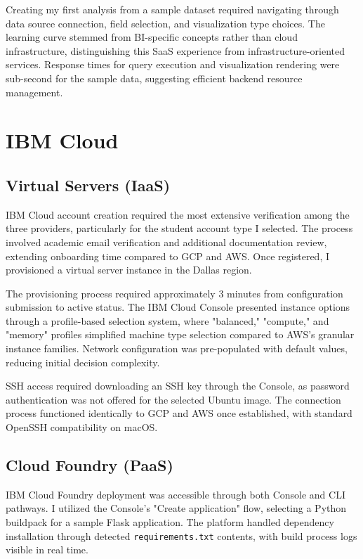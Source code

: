 \documentclass[11pt,a4paper]{article}
\begin{document}
Creating my first analysis from a sample dataset required navigating through data source connection, field selection, and visualization type choices. The learning curve stemmed from BI-specific concepts rather than cloud infrastructure, distinguishing this SaaS experience from infrastructure-oriented services. Response times for query execution and visualization rendering were sub-second for the sample data, suggesting efficient backend resource management.

\section{IBM Cloud}

\subsection{Virtual Servers (IaaS)}
IBM Cloud account creation required the most extensive verification among the three providers, particularly for the student account type I selected. The process involved academic email verification and additional documentation review, extending onboarding time compared to GCP and AWS. Once registered, I provisioned a virtual server instance in the Dallas region.

The provisioning process required approximately 3 minutes from configuration submission to active status. The IBM Cloud Console presented instance options through a profile-based selection system, where "balanced," "compute," and "memory" profiles simplified machine type selection compared to AWS's granular instance families. Network configuration was pre-populated with default values, reducing initial decision complexity.

SSH access required downloading an SSH key through the Console, as password authentication was not offered for the selected Ubuntu image. The connection process functioned identically to GCP and AWS once established, with standard OpenSSH compatibility on macOS.

\subsection{Cloud Foundry (PaaS)}
IBM Cloud Foundry deployment was accessible through both Console and CLI pathways. I utilized the Console's "Create application" flow, selecting a Python buildpack for a sample Flask application. The platform handled dependency installation through detected \texttt{requirements.txt} contents, with build process logs visible in real time.
\end{document}
